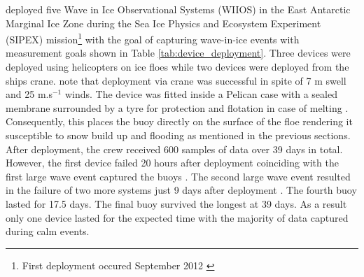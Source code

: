 \textcite{kohout2015device} deployed five Wave in Ice Observational Systems (WIIOS) in the East Antarctic Marginal Ice Zone during the Sea Ice Physics and Ecosystem Experiment (SIPEX) mission\footnote{First deployment occured September 2012 \cite{kohout2015device}} with the goal of capturing wave-in-ice events with measurement goals shown in Table \ref{tab:device_deployment}. Three devices were deployed using helicopters on ice floes while two devices were deployed from the ships crane. \textcite{kohout2015device}
note that deployment via crane was successful in spite of 7 m swell and 25 m.s$^{-1}$ winds. The device was fitted inside a Pelican case with a sealed membrane surrounded by a tyre for protection and flotation in case of melting \cite{kohout2015device}. Consequently, this places the buoy directly on the surface of the floe rendering it susceptible to snow build up and flooding as mentioned in the previous sections.  After deployment, the crew received 600 samples of data over 39 days in total. However, the first device failed 20 hours after deployment coinciding with the first large wave event captured the buoys \cite{kohout2015device}. The second large wave event resulted in the failure of two more systems just 9 days after deployment \cite{kohout2015device}. The fourth buoy lasted for 17.5 days. The final buoy survived the longest at 39 days. As a result only one device lasted for the expected time with the majority of data captured during calm events.

